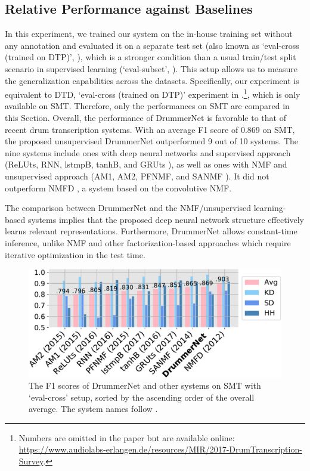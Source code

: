 \documentclass{article}
\newcommand{\squeeze}{\vspace{-0.15cm}}
\begin{document}
	\subsection{Relative Performance against Baselines}\label{sec:relative_performance}
	In this experiment, we trained our system on the in-house training set without any annotation and evaluated it on a separate test set (also known as `eval-cross (trained on DTP)', \cite{wu2018review}), which is a stronger condition than a usual train/test split scenario in supervised learning (`eval-subset', \cite{wu2018review}). This setup allows us to measure the generalization capabilities across the datasets. Specifically, our experiment is equivalent to DTD, `eval-cross (trained on DTP)' experiment in \cite{wu2018review}.\footnote{
		Numbers are omitted in the paper but are available online: \url{https://www.audiolabs-erlangen.de/resources/MIR/2017-DrumTranscription-Survey}.
	}, which is only available on SMT. Therefore, only the performances on SMT are compared in this Section. 
	Overall, the performance of DrummerNet is favorable to that of recent drum transcription systems. With an average F1 score of 0.869 on SMT, the proposed unsupervised DrummerNet outperformed 9 out of 10 systems. The nine systems include ones with deep neural networks and supervised approach (ReLUts, RNN, lstmpB, tanhB, and GRUts \cite{vogl2016recurrent, southall2017automatic, southall2016automatic, vogl2017drum}),
	as well as ones with NMF and unsupervised approach (AM1, AM2, PFNMF, and SANMF \cite{dittmar2014real, wu2015drum}).
	It did not outperform NMFD \cite{lindsay2012drumkit}, a system based on the convolutive NMF. 
	
	The comparison between DrummerNet and the NMF/unsupervised learning-based systems \cite{dittmar2014real, wu2015drum} implies that the proposed deep neural network structure effectively learns relevant representations. Furthermore, DrummerNet allows constant-time inference, unlike NMF and other factorization-based approaches which require iterative optimization in the test time.
	
	
	\begin{figure}[t]
		\centering
		\includegraphics[width=\columnwidth]{results_comparison_split.pdf}
		\caption{The F1 scores of DrummerNet and other systems on SMT with `eval-cross' setup, sorted by the ascending order of the overall average. The system names follow \cite{wu2018review}.}
		\label{fig:result_compare}
		\squeeze
	\end{figure}
	
\end{document}
